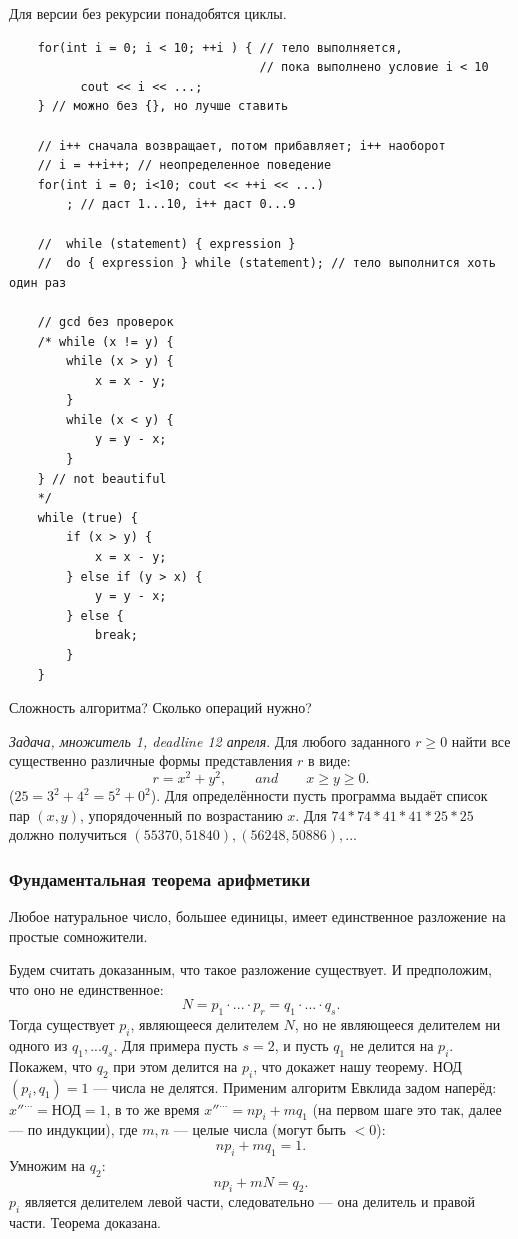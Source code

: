 \documentclass{book}
\begin{document}
Для версии без рекурсии понадобятся циклы.
\begin{verbatim}
    for(int i = 0; i < 10; ++i ) { // тело выполняется,
                                   // пока выполнено условие i < 10
          cout << i << ...;
    } // можно без {}, но лучше ставить

    // i++ сначала возвращает, потом прибавляет; i++ наоборот
    // i = ++i++; // неопределенное поведение
    for(int i = 0; i<10; cout << ++i << ...) 
        ; // даст 1...10, i++ даст 0...9

    //  while (statement) { expression }
    //  do { expression } while (statement); // тело выполнится хоть один раз

    // gcd без проверок
    /* while (x != y) {
        while (x > y) {
            x = x - y;
        }
        while (x < y) {
            y = y - x;
        }
    } // not beautiful
    */
    while (true) {
        if (x > y) {
            x = x - y;
        } else if (y > x) {
            y = y - x;
        } else {
            break;
        }
    }
\end{verbatim}

Сложность алгоритма? Сколько операций нужно?

\textit{Задача, множитель 1, deadline 12 апреля}.
Для любого заданного $r \geq 0$ найти все существенно различные формы представления $r$ в виде:
\begin{equation}
    r = x^2 + y^2, \qquad and \qquad x \geq y \geq 0.
\end{equation}
($25 = 3^2 + 4^2 = 5^2 + 0^2$). Для определённости пусть программа выдаёт список пар $(x,
y)$, упорядоченный по возрастанию $x$. Для $74*74*41*41*25*25$ должно получиться $(55370,51840),(56248,50886),..$.

\subsubsection{Фундаментальная теорема арифметики}

Любое натуральное число, большее единицы, имеет единственное разложение на простые сомножители.

Будем считать доказанным, что такое разложение существует. И предположим, что оно не единственное:
\begin{equation}
    N = p_1 \cdot ... \cdot p_r = q_1 \cdot ... \cdot q_s.
\end{equation}
Тогда существует $p_i$, являющееся делителем $N$, но не являющееся делителем ни одного из $q_1, ...
q_s$. Для примера пусть $s = 2$, и пусть $q_1$ не делится на $p_i$. Покажем, что $q_2$ при этом
делится на $p_i$, что докажет нашу теорему. НОД$(p_i, q_1) = 1$ --- числа не делятся. Применим
алгоритм Евклида задом наперёд: $x''^{...} = $НОД$=1$, в то же время $x''^{...} = np_i + mq_1$ (на
первом шаге это так, далее --- по индукции), где $m, n$ --- целые числа (могут быть $<0$):
\begin{equation}
    np_i + mq_1 = 1.
\end{equation}
Умножим на $q_2$:
\begin{equation}
    np_i + mN = q_2.
\end{equation}
$p_i$ является делителем левой части, следовательно --- она делитель и правой части. Теорема
доказана.
\end{document}
